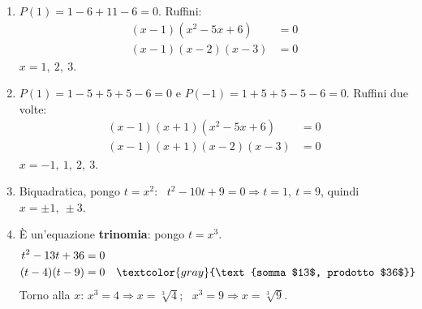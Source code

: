 \begin{question}[ID=4.5, subtitle={Equazioni di grado superiore al secondo con scomposizioni complesse}, difficulty=difficile, tags={equazioni di grado superiore}]
\begin{explanation}
\begin{enumerate}
\[\begin{aligned}
    (x-1)(x+1)(x+3)(x-2) &= 0
    \end{aligned}\]
    $x=-3,\ -1,\ 1,\ 2$.
    \item $P(1)=1-6+11-6=0$. Ruffini:
    \[\begin{aligned}
    (x-1)(x^2-5x+6) &= 0\\
    (x-1)(x-2)(x-3) &= 0
    \end{aligned}\]
    $x=1,\ 2,\ 3$.
    \item $P(1)=1-5+5+5-6=0$ e $P(-1)=1+5+5-5-6=0$. Ruffini due volte:
    \[\begin{aligned}
    (x-1)(x+1)(x^2-5x+6) &= 0\\
    (x-1)(x+1)(x-2)(x-3) &= 0
    \end{aligned}\]
    $x=-1,\ 1,\ 2,\ 3$.
    \item Biquadratica, pongo $t=x^2$: \ $t^2-10t+9=0 \Rightarrow t=1,\ t=9$, quindi $x=\pm1,\ \pm3$.
    \item È un'equazione \textbf{trinomia}: pongo $t=x^3$.
    \[\begin{aligned}
    t^2-13t+36 &= 0\\
    (t-4)(t-9) &= 0 && \textcolor{gray}{\text{somma $13$, prodotto $36$}}
    \end{aligned}\]
    Torno alla $x$: $x^3=4 \Rightarrow x=\sqrt[3]{4}$; \ $x^3=9 \Rightarrow x=\sqrt[3]{9}$.
\end{enumerate}
\end{explanation}
\end{question}



